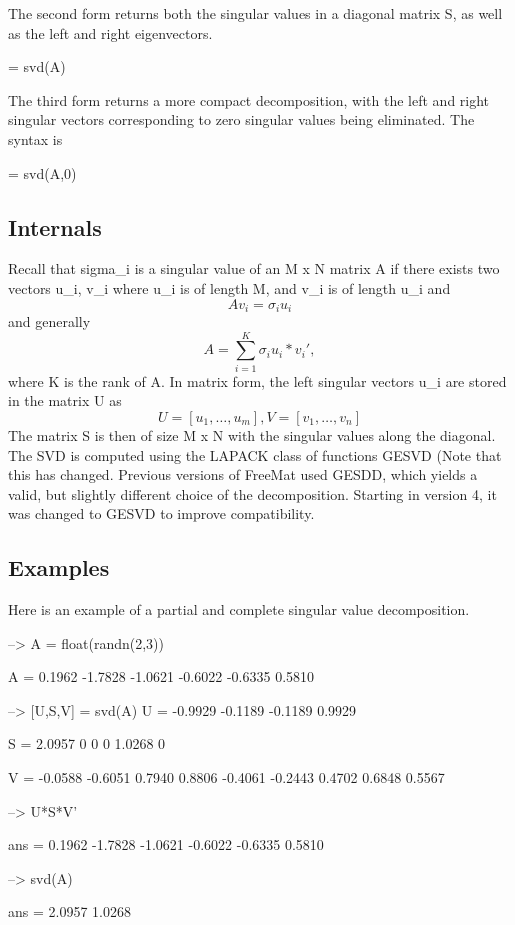  The second form returns both the singular values in a diagonal matrix {\ttfamily S}, as well as the left and right eigenvectors. \begin{DoxyVerb}  [U,S,V] = svd(A)
\end{DoxyVerb}
 The third form returns a more compact decomposition, with the left and right singular vectors corresponding to zero singular values being eliminated. The syntax is \begin{DoxyVerb}  [U,S,V] = svd(A,0)
\end{DoxyVerb}
 \hypertarget{transforms_svd_Function}{}\subsection{Internals}\label{transforms_svd_Function}
Recall that {\ttfamily sigma\-\_\-i} is a singular value of an {\ttfamily M x N} matrix {\ttfamily A} if there exists two vectors {\ttfamily u\-\_\-i, v\-\_\-i} where {\ttfamily u\-\_\-i} is of length {\ttfamily M}, and {\ttfamily v\-\_\-i} is of length {\ttfamily u\-\_\-i} and \[ A v_i = \sigma_i u_i \] and generally \[ A = \sum_{i=1}^{K} \sigma_i u_i*v_i', \] where {\ttfamily K} is the rank of {\ttfamily A}. In matrix form, the left singular vectors {\ttfamily u\-\_\-i} are stored in the matrix {\ttfamily U} as \[ U = [u_1,\ldots,u_m], V = [v_1,\ldots,v_n] \] The matrix {\ttfamily S} is then of size {\ttfamily M x N} with the singular values along the diagonal. The S\-V\-D is computed using the {\ttfamily L\-A\-P\-A\-C\-K} class of functions {\ttfamily G\-E\-S\-V\-D} (Note that this has changed. Previous versions of Free\-Mat used {\ttfamily G\-E\-S\-D\-D}, which yields a valid, but slightly different choice of the decomposition. Starting in version 4, it was changed to {\ttfamily G\-E\-S\-V\-D} to improve compatibility. \hypertarget{variables_matrix_Examples}{}\subsection{Examples}\label{variables_matrix_Examples}
Here is an example of a partial and complete singular value decomposition.


\begin{DoxyVerbInclude}
--> A = float(randn(2,3))

A = 
    0.1962   -1.7828   -1.0621 
   -0.6022   -0.6335    0.5810 

--> [U,S,V] = svd(A)
U = 
   -0.9929   -0.1189 
   -0.1189    0.9929 

S = 
    2.0957         0         0 
         0    1.0268         0 

V = 
   -0.0588   -0.6051    0.7940 
    0.8806   -0.4061   -0.2443 
    0.4702    0.6848    0.5567 

--> U*S*V'

ans = 
    0.1962   -1.7828   -1.0621 
   -0.6022   -0.6335    0.5810 

--> svd(A)

ans = 
    2.0957 
    1.0268 
\end{DoxyVerbInclude}
 